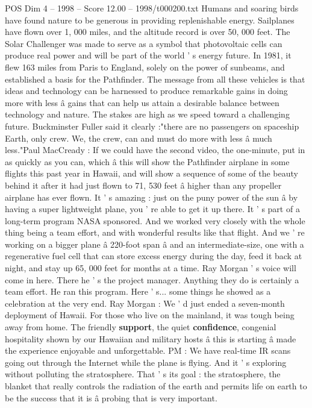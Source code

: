 \begin{textsample}{POS Dim 4 – 1998 – Score 12.00 – 1998/t000200.txt}
Humans and soaring birds have found nature to be generous in providing replenishable energy.
Sailplanes have flown over 1, 000 miles, and the altitude record is over 50, 000 feet.
The Solar Challenger was made to serve as a symbol that photovoltaic cells can produce real power and will be part of the world ' s energy future.
In 1981, it flew 163 miles from Paris to England, solely on the power of sunbeams, and established a basis for the Pathfinder.
The message from all these vehicles is that ideas and technology can be harnessed to produce remarkable gains in doing more with less â gains that can help us attain a desirable balance between technology and nature.
The stakes are high as we speed toward a challenging future.
Buckminster Fuller said it clearly :"there are no passengers on spaceship Earth, only crew.
We, the crew, can and must do more with less â much less."Paul MacCready : If we could have the second video, the one-minute, put in as quickly as you can, which â this will show the Pathfinder airplane in some flights this past year in Hawaii, and will show a sequence of some of the beauty behind it after it had just flown to 71, 530 feet â higher than any propeller airplane has ever flown.
It ' s amazing : just on the puny power of the sun â by having a super lightweight plane, you ' re able to get it up there.
It ' s part of a long-term program NASA sponsored.
And we worked very closely with the whole thing being a team effort, and with wonderful results like that flight.
And we ' re working on a bigger plane â 220-foot span â and an intermediate-size, one with a regenerative fuel cell that can store excess energy during the day, feed it back at night, and stay up 65, 000 feet for months at a time.
Ray Morgan ' s voice will come in here.
There he ' s the project manager.
Anything they do is certainly a team effort.
He ran this program.
Here ' s... some things he showed as a celebration at the very end.
Ray Morgan : We ' d just ended a seven-month deployment of Hawaii.
For those who live on the mainland, it was tough being away from home.
The friendly \textbf{support}, the quiet \textbf{confidence}, congenial hospitality shown by our Hawaiian and military hosts â this is starting â made the experience enjoyable and unforgettable.
PM : We have real-time IR scans going out through the Internet while the plane is flying.
And it ' s exploring without polluting the stratosphere.
That ' s its goal : the stratosphere, the blanket that really controls the radiation of the earth and permits life on earth to be the success that it is â probing that is very important.

\end{textsample}
